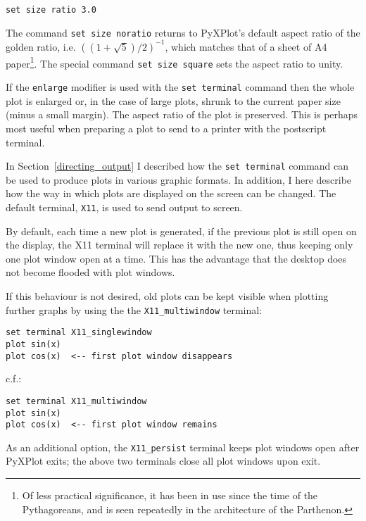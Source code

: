 \documentclass[a4paper,onecolumn,11pt]{book}
\begin{document}
\begin{verbatim}
set size ratio 3.0
\end{verbatim}

The command \texttt{set size noratio} returns to PyXPlot's default aspect ratio
of the golden ratio, i.e. $\left((1+\sqrt{5})/2\right)^{-1}$, which matches
that of a sheet of A4 paper\footnote{Of less practical significance, it has
been in use since the time of the Pythagoreans, and is seen repeatedly in the
architecture of the Parthenon.}.  The special command \texttt{set size
square} sets
the aspect ratio to unity.

If the \texttt{enlarge} modifier is used with the {\tt set terminal} command
then the whole plot is enlarged or, in the case of large plots, shrunk to the
current paper size (minus a small margin).  The aspect ratio of the plot is
preserved.  This is perhaps most useful when preparing a plot to send to a
printer with the postscript terminal.

In Section~\ref{directing_output} I described how the \texttt{set terminal}
command can be used
to produce plots in various graphic formats. In addition, I here describe how
the way in which plots are displayed on the screen can be changed. The default
terminal, \texttt{X11}, is used to send output to screen.

By default, each time a new plot is generated, if the previous plot is still
open on the display, the X11 terminal will replace it with the new one, thus
keeping only one plot window open at a time. This has the advantage that the
desktop does not become flooded with plot windows.

If this behaviour is not desired, old plots can be kept visible when plotting
further graphs by using the the \texttt{X11\_multiwindow} terminal: 

\begin{verbatim} 
set terminal X11_singlewindow
plot sin(x)
plot cos(x)  <-- first plot window disappears
\end{verbatim}

\noindent c.f.:

\begin{verbatim} 
set terminal X11_multiwindow
plot sin(x)
plot cos(x)  <-- first plot window remains
\end{verbatim}

As an additional option, the \texttt{X11\_persist} terminal keeps plot windows
open after PyXPlot exits; the above two terminals close all plot windows upon
exit.
\end{document}
